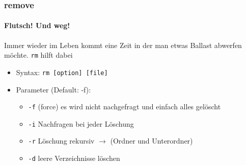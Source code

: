 \documentclass[12pt,utf8]{beamer}
\begin{document}
\begin{frame}
\frametitle{remove}
\framesubtitle{Flutsch! Und weg!}
Immer wieder im Leben kommt eine Zeit in der man etwas Ballast abwerfen möchte.  
\texttt{rm} hilft dabei
\begin{itemize}
	\item Syntax: \texttt{rm [option] [file]}
	\item Parameter (Default: -f):
	\begin{itemize}[<+->]
		\item \texttt{-f} (force) es wird nicht nachgefragt und einfach alles gelöscht
		\item \texttt{-i} Nachfragen bei jeder Löschung
		\item \texttt{-r} Löschung rekursiv $\to$ (Ordner und Unterordner)
		\item \texttt{-d} leere Verzeichnisse löschen
	\end{itemize}
\end{itemize}
\end{frame}

\end{document}
